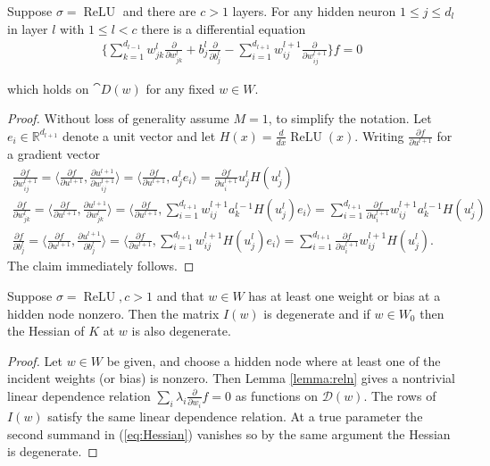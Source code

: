 \documentclass{article} %
\begin{document}
\begin{lemma}\label{lemma:reln}
	Suppose $\sigma = \operatorname{ReLU}$ and there are $c > 1$ layers. For any hidden neuron $1 \le j \le d_l$ in layer $l$ with $1 \le l < c$ there is a differential equation
	\begin{align*}
		\Big\{ \sum_{k=1}^{d_{l-1}}w_{jk}^{l}\frac{\partial}{\partial w_{jk}^{l}} + b_{j}^{l}\frac{\partial}{\partial b_{j}^{l}}-\sum_{i=1}^{d_{l+1}}w_{ij}^{l+1}\frac{\partial}{\partial w_{ij}^{l+1}} \Big\} f =0
	\end{align*}
\end{lemma}
which holds on $\cat{D}(w)$ for any fixed $w \in W$.
\begin{proof}
Without loss of generality assume $M = 1$, to simplify the notation. Let $e_{i}\in \mathbb{R}^{d_{l+1}}$ denote a unit vector and let $H(x)=\frac{d}{dx}\operatorname{ReLU}(x)$. Writing $\frac{\partial f}{\partial u^{l+1}}$ for a gradient vector
\begin{gather*}
	\frac{\partial f}{\partial w_{ij}^{l+1}} = \Big\langle \frac{\partial f}{\partial u^{l+1}}, \frac{\partial u^{l+1}}{\partial w_{ij}^{l+1}} \Big\rangle = \Big\langle \frac{\partial f}{\partial u^{l+1}}, a_{j}^{l}e_{i} \Big\rangle =\frac{\partial f}{\partial u^{l+1}_i}u_{j}^{l}H(u_{j}^{l})\\
	\frac{\partial f}{\partial w_{jk}^{l}} =\Big\langle \frac{\partial f}{\partial u^{l+1}}, \frac{\partial u^{l+1}}{\partial w_{jk}^{l}} \Big\rangle = \Big\langle \frac{\partial f}{\partial u^{l+1}}, \sum_{i=1}^{d_{l+1}} w_{ij}^{l+1}a_{k}^{l-1}H(u_{j}^{l})e_{i} \Big\rangle = \sum_{i=1}^{d_{l+1}} \frac{\partial f}{\partial u^{l+1}_i}w_{ij}^{l+1}a_{k}^{l-1}H(u_{j}^{l}) \\
	\frac{\partial f}{\partial b_{j}^{l}} = \Big\langle \frac{\partial f}{\partial u^{l+1}}, \frac{\partial u^{l+1}}{\partial b_{j}^{l}} \Big\rangle =\Big\langle \frac{\partial f}{\partial u^{l+1}}, \sum_{i=1}^{d_{l+1}}w_{ij}^{l+1}H(u_{j}^{l})e_{i} \Big\rangle = \sum_{i=1}^{d_{l+1}} \frac{\partial f}{\partial u^{l+1}_i}w_{ij}^{l+1}H(u_{j}^{l}).
\end{gather*}
The claim immediately follows.
\end{proof}

\begin{lemma}\label{lemma:all_degen} Suppose $\sigma = \operatorname{ReLU}, c > 1$ and that $w \in W$ has at least one weight or bias at a hidden node nonzero. Then the matrix $I(w)$ is degenerate and if $w \in W_0$ then the Hessian of $K$ at $w$ is also degenerate.
\end{lemma}
\begin{proof}
	Let $w \in W$ be given, and choose a hidden node where at least one of the incident weights (or bias) is nonzero. Then Lemma \ref{lemma:reln} gives a nontrivial linear dependence relation $\sum_i \lambda_i \frac{\partial}{\partial w_i} f = 0$ as functions on $\mathcal{D}(w)$. The rows of $I(w)$ satisfy the same linear dependence relation. At a true parameter the second summand in (\ref{eq:Hessian}) vanishes so by the same argument the Hessian is degenerate.
\end{proof}
\end{document}
